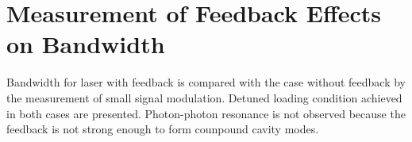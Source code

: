 


\section{Measurement of Feedback Effects on Bandwidth}\label{sec:bandwidth_measurement}
Bandwidth for laser with feedback is compared with the case without feedback by the measurement of small signal modulation. Detuned loading condition achieved in both cases are presented. Photon-photon resonance is not observed because the feedback is not strong enough to form counpound cavity modes.

